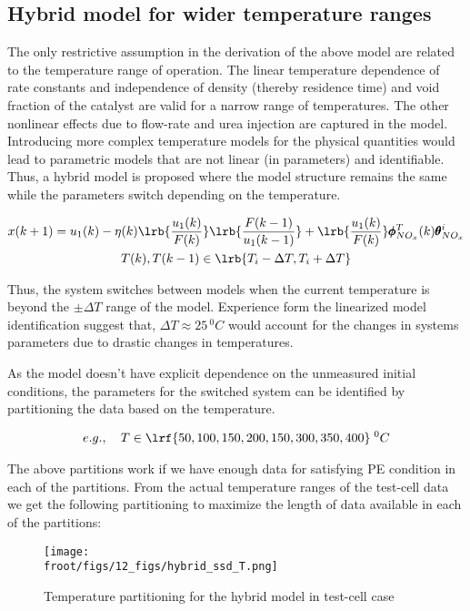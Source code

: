\subsection{Hybrid model for wider temperature ranges}

The only restrictive assumption in the derivation of the above model are related to the temperature range of operation.
The linear temperature dependence of rate constants and independence of density (thereby residence time) and void
fraction of the catalyst are valid for a narrow range of temperatures. The other nonlinear effects due to flow-rate and
urea injection are captured in the model. Introducing more complex temperature models for the physical quantities would
lead to parametric models that are not linear (in parameters) and identifiable. Thus, a hybrid model is proposed where
the model structure remains the same while the parameters switch depending on the temperature.

\begin{multline}
        x(k+1) = u_1(k) - \eta(k) \lrb{\frac{u_1(k)}{F(k)}} \lrb{\frac{F(k-1)}{u_1(k-1)}}
                        + \lrb{\frac{u_1(k)}{F(k)}} \pmb \phi^{T}_{NO_x}(k) \pmb \theta^i_{NO_x}
        \\
        T(k), T(k-1) \in \lrb{T_i-\Delta T, T_i + \Delta T}
\end{multline}

Thus, the system switches between models when the current temperature is beyond the $\pm \Delta T$ range of the model.
Experience form the linearized model identification suggest that, $\Delta T \approx 25 \, ^0C$ would account for
the changes in systems parameters due to drastic changes in temperatures.

As the model doesn't have explicit dependence on the unmeasured initial conditions, the parameters for the switched system can be identified by partitioning the data based on the temperature.

\begin{align}
        e.g., \quad T \in \lrf{50, 100, 150, 200, 150, 300, 350, 400} \; ^0C
\end{align}

The above partitions work if we have enough data for satisfying PE condition in each of the partitions. From the actual temperature ranges of the test-cell data we get the following partitioning to maximize the length of data available in each of the partitions:


\begin{figure}[H]
        \centering
        \texttt{[image: \\froot/figs/12\_figs/hybrid\_ssd\_T.png]}
        \caption{Temperature partitioning for the hybrid model in test-cell case}
\end{figure}

